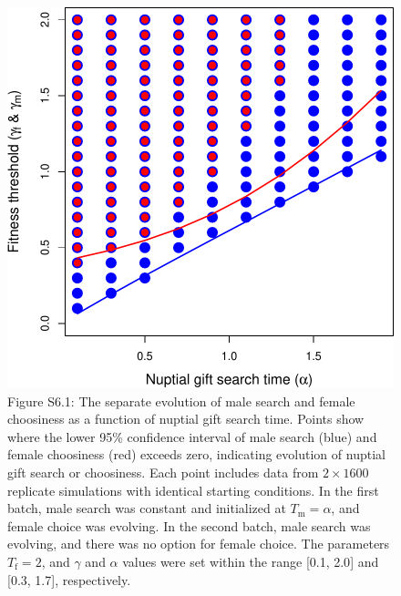 \documentclass[
]{article}
\begin{document}
\begin{figure}
\centering
\includegraphics{ms_biorxiv_files/figure-latex/unnamed-chunk-16-1.pdf}
\caption{Figure S6.1: The separate evolution of male search and female
choosiness as a function of nuptial gift search time. Points show where
the lower 95\% confidence interval of male search (blue) and female
choosiness (red) exceeds zero, indicating evolution of nuptial gift
search or choosiness. Each point includes data from \(2 \times 1600\)
replicate simulations with identical starting conditions. In the first
batch, male search was constant and initialized at
\(T_{\mathrm{m}} = \alpha\), and female choice was evolving. In the
second batch, male search was evolving, and there was no option for
female choice. The parameters \(T_{\mathrm{f}}=2\), and \(\gamma\) and
\(\alpha\) values were set within the range {[}0.1, 2.0{]} and {[}0.3,
1.7{]}, respectively.}
\end{figure}

\captionsetup{labelformat=default}
\end{document}
